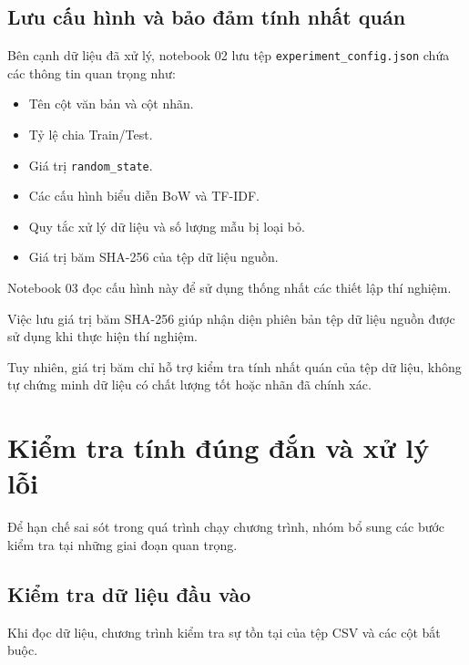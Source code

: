 \subsection{Lưu cấu hình và bảo đảm tính nhất quán}

Bên cạnh dữ liệu đã xử lý, notebook 02 lưu tệp \texttt{experiment\_config.json} chứa các thông tin quan trọng như:

\begin{itemize}
    \item Tên cột văn bản và cột nhãn.

    \item Tỷ lệ chia Train/Test.

    \item Giá trị \texttt{random\_state}.

    \item Các cấu hình biểu diễn BoW và TF-IDF.

    \item Quy tắc xử lý dữ liệu và số lượng mẫu bị loại bỏ.

    \item Giá trị băm SHA-256 của tệp dữ liệu nguồn.
\end{itemize}

Notebook 03 đọc cấu hình này để sử dụng thống nhất các thiết lập thí nghiệm.

Việc lưu giá trị băm SHA-256 giúp nhận diện phiên bản tệp dữ liệu nguồn được sử dụng khi thực hiện thí nghiệm.

Tuy nhiên, giá trị băm chỉ hỗ trợ kiểm tra tính nhất quán của tệp dữ liệu, không tự chứng minh dữ liệu có chất lượng tốt hoặc nhãn đã chính xác.



\section{Kiểm tra tính đúng đắn và xử lý lỗi}

Để hạn chế sai sót trong quá trình chạy chương trình, nhóm bổ sung các bước kiểm tra tại những giai đoạn quan trọng.

\subsection{Kiểm tra dữ liệu đầu vào}

Khi đọc dữ liệu, chương trình kiểm tra sự tồn tại của tệp CSV và các cột bắt buộc.

